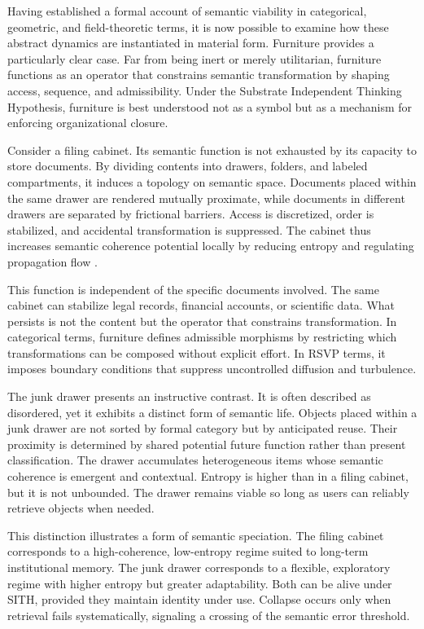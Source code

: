 \documentclass[11pt,oneside]{article}
\begin{document}
Having established a formal account of semantic viability in categorical, geometric, and field-theoretic terms, it is now possible to examine how these abstract dynamics are instantiated in material form. Furniture provides a particularly clear case. Far from being inert or merely utilitarian, furniture functions as an operator that constrains semantic transformation by shaping access, sequence, and admissibility. Under the Substrate Independent Thinking Hypothesis, furniture is best understood not as a symbol but as a mechanism for enforcing organizational closure.

Consider a filing cabinet. Its semantic function is not exhausted by its capacity to store documents. By dividing contents into drawers, folders, and labeled compartments, it induces a topology on semantic space. Documents placed within the same drawer are rendered mutually proximate, while documents in different drawers are separated by frictional barriers. Access is discretized, order is stabilized, and accidental transformation is suppressed. The cabinet thus increases semantic coherence potential locally by reducing entropy and regulating propagation flow .

This function is independent of the specific documents involved. The same cabinet can stabilize legal records, financial accounts, or scientific data. What persists is not the content but the operator that constrains transformation. In categorical terms, furniture defines admissible morphisms by restricting which transformations can be composed without explicit effort. In RSVP terms, it imposes boundary conditions that suppress uncontrolled diffusion and turbulence.

The junk drawer presents an instructive contrast. It is often described as disordered, yet it exhibits a distinct form of semantic life. Objects placed within a junk drawer are not sorted by formal category but by anticipated reuse. Their proximity is determined by shared potential future function rather than present classification. The drawer accumulates heterogeneous items whose semantic coherence is emergent and contextual. Entropy is higher than in a filing cabinet, but it is not unbounded. The drawer remains viable so long as users can reliably retrieve objects when needed.

This distinction illustrates a form of semantic speciation. The filing cabinet corresponds to a high-coherence, low-entropy regime suited to long-term institutional memory. The junk drawer corresponds to a flexible, exploratory regime with higher entropy but greater adaptability. Both can be alive under SITH, provided they maintain identity under use. Collapse occurs only when retrieval fails systematically, signaling a crossing of the semantic error threshold.
\end{document}
